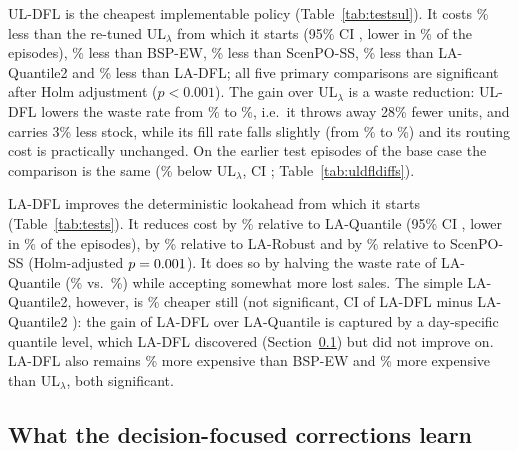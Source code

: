 UL-DFL is the cheapest implementable policy (Table~\ref{tab:testsul}). It costs \ULabsrelULBaseFresh\% less than the re-tuned UL$_\lambda$ from which it starts (95\% CI \ULciULBaseFresh{}, lower in \ULwinULBaseFresh\% of the episodes), \ULabsrelBSPEWBaseFresh\% less than BSP-EW, \ULabsrelScenPOBaseFresh\% less than ScenPO-SS, \ULabsrelLAQTwoBaseFresh\% less than LA-Quantile2 and \ULabsrelDFLBaseFresh\% less than LA-DFL; all five primary comparisons are significant after Holm adjustment ($p<0.001$). The gain over UL$_\lambda$ is a waste reduction: UL-DFL lowers the waste rate from \wasteULBaseFresh\% to \wasteULDFLBaseFresh\%, i.e.\ it throws away 28\% fewer units, and carries 3\% less stock, while its fill rate falls slightly (from \fillULBaseFresh\% to \fillULDFLBaseFresh\%) and its routing cost is practically unchanged. On the earlier test episodes of the base case the comparison is the same (\ULabsrelULBase\% below UL$_\lambda$, CI \ULciULBase{}; Table~\ref{tab:uldfldiffs}).

\begin{table}[H]
\centering\footnotesize
\caption{Paired episode-level comparisons of LA-DFL with every other policy (base case, fresh test episodes, 100 episodes). Negative differences favour LA-DFL. Rel.: as in Table~\ref{tab:testsul}. Holm adjustment over the five prespecified primary comparisons of LA-DFL.}\label{tab:tests}
\setlength{\tabcolsep}{4pt}
\resizebox{\textwidth}{!}{}
\end{table}

LA-DFL improves the deterministic lookahead from which it starts (Table~\ref{tab:tests}). It reduces cost by \absrelLAQBaseFresh\% relative to LA-Quantile (95\% CI \ciLAQBaseFresh{}, lower in \winLAQBaseFresh\% of the episodes), by \absrelLARobBaseFresh\% relative to LA-Robust and by \absrelScenPOBaseFresh\% relative to ScenPO-SS (Holm-adjusted $p=0.001$). It does so by halving the waste rate of LA-Quantile (\wasteDFLBaseFresh\% vs.\ \wasteLAQBaseFresh\%) while accepting somewhat more lost sales. The simple LA-Quantile2, however, is \absrelLAQTwoBaseFresh\% cheaper still (not significant, CI of LA-DFL minus LA-Quantile2 \ciLAQTwoBaseFresh{}): the gain of LA-DFL over LA-Quantile is captured by a day-specific quantile level, which LA-DFL discovered (Section~\ref{sec:dflresults}) but did not improve on. LA-DFL also remains \absrelBSPEWBaseFresh\% more expensive than BSP-EW and \absrelULBaseFresh\% more expensive than UL$_\lambda$, both significant.

\subsection{What the decision-focused corrections learn}\label{sec:dflresults}

